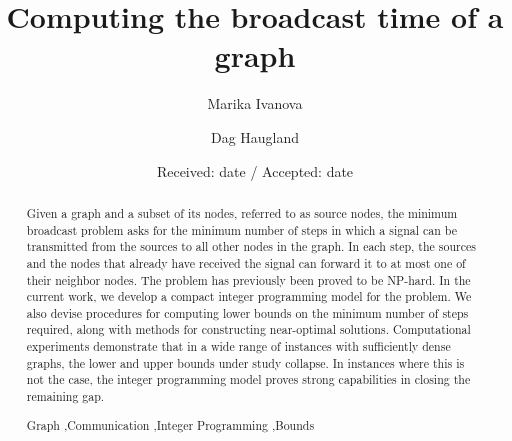 \documentclass[preprint,12pt, review]{elsarticle}
\begin{document}
\begin{frontmatter}

\title{Computing the broadcast time of a graph}

\author{Marika Ivanova}

\author{Dag Haugland}

\address{Department of Informatics, University of Bergen, Norway}


\date{Received: date / Accepted: date}

\begin{abstract}
Given a graph and a subset of its nodes, referred to as source nodes, the minimum broadcast problem asks for the minimum number of steps in which a signal can be transmitted from the sources to all other nodes in the graph.
In each step, the sources and the nodes that already have received the signal can forward it to at most one of their neighbor nodes.
The problem has previously been proved to be NP-hard. 
In the current work, we develop a compact integer programming model for the problem.
We also devise procedures for computing lower bounds on the minimum number of steps required, along with methods for constructing near-optimal solutions.
Computational experiments demonstrate that in a wide range of instances with sufficiently dense graphs, the lower and upper bounds under study collapse.
In instances where this is not the case, the integer programming model proves strong capabilities in closing the remaining gap.

\begin{keyword}
Graph \sep Communication \sep Integer Programming \sep Bounds
\end{keyword}
\end{abstract}
\end{frontmatter}








\end{document}
